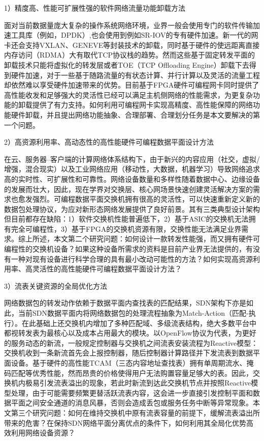 
1）精度高、性能可扩展性强的软件网络流量功能卸载方法

面对当前数据量庞大复杂的操作系统网络环境，业界一般会使用专门的软件传输加速工具库（例如，DPDK）,也会使用到例如SR-IOV的专有硬件加速。新一代的网卡还会支持VXLAN、GENEVE等封装技术的卸载，同时基于硬件的使远距离直接内存访问（RDMA）大有取代TCP协议栈的趋势。然而这些基于固定转发平面的卸载技术只能将虚拟化的转发层或者TOE（TCP Offloading Engine）卸载下去得到硬件加速，对于一些基于随路流量的有状态计算、并行计算以及灵活的流量工程却依然难以享受硬件加速带来的优势。目前基于FPGA硬件可编程网卡同时提供了高性能收发和足够强大的灵活性已经可以满足主机侧网络的性能需求，为更复杂功能的卸载提供了有力支持。如何利用可编程网卡实现高精度、高性能保障的网络功能硬件卸载，并且提出网络功能抽象、合理部署、合理划分任务是本文要解决的第一个问题。

2）高资源利用率、高动态性的高性能硬件可编程数据平面设计方法

在云、服务器--客户端的计算网络体系结构下，由于新兴的内容应用（社交，虚拟/增强，混合现实）以及工业网络应用（移动性，大数据，机器学习）导致网络追求高的实时性、可扩展性和可靠性。网络设备数量和多样性随着数据中心、边缘设备的发展而壮大，因此，现在学界对交换层、核心网场景快速创建灵活解决方案的需求也愈发强烈。可编程数据平面交换机拥有很高的灵活性，可以快速重新定义新的数据包处理协议，为应对新形态网络发展提供了良好前景。其有三类典型设计架构但目前都存在缺陷：1）软件交换机性能普遍低下，2）基于ASIC的交换机无法拥有完全可编程性，3）基于FPGA的交换机资源有限，交换性能无法满足业界需求。综上所述，本文第二个研究问题：如何设计一款转发性能强，而又拥有硬件可编程性的交换机设备？如果这种设备所需求的资料是目前产业界无法提供的，有没有一种对现有设备进行科学合理的具有最小改动可能性的方法？如何实现高资源利用率、高灵活性的高性能硬件可编程数据平面设计方法？

3）流表关键资源的全局优化方法

网络数据包的转发动作依赖于数据平面内查找表的匹配结果，SDN架构下亦是如此，当前SDN数据平面内将网络数据包的处理流程抽象为Match-Action（匹配-执行）。在此基础上还交换机内增加了多种匹配域、多级流表结构，绝大多数平台中都视转发表为最核心以及成本占用最大的模块。以OpenFlow协议为代表，为更好的服务动态的新流，一般规定控制器与交换机之间流表安装流程为Reactive模型：交换机收到一条新流首先会上报控制器，随后控制器计算路径并下发流表到数据平面设备。基于硬件的高性能TCAM（三态内容地址查找表）拥有单周期流水、掩码匹配等优秀性能，然而昂贵的价格使得用户无法购置容量足够大的表。因此，交换机内极易引发流表溢出的现象，若此时新流到达此交换机节点并按照Reactive模型处理，由于可能需要频繁更替活跃流表内容，这会进一步直接引发控制平面和数据平面之间安全通道的消息风暴，否则会造成丢包或服务任务中断等异常现象。本文第三个研究问题：如何在维持交换机中原有流表容量的前提下，缓解流表溢出所带来的危害？在保持SDN网络平面分离优点的条件下，如何利用其全局化优势高效利用网络设备资源？


